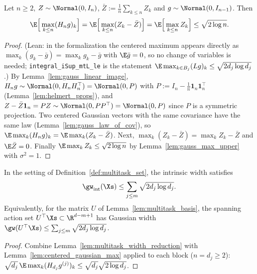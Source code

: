 \begin{lemma}\label{lem:centered_gaussian_max}
\leanok
{}
Let $n \ge 2$, $Z \sim \Normal(0, I_n)$, $\bar Z := \frac1n\sum_{k\le n}Z_k$ and
$g \sim \Normal(0, I_{n-1})$. Then
\[
  \E\Big[\max_{k\le n}(H_ng)_k\Big] = \E\Big[\max_{k\le n}(Z_k - \bar Z)\Big]
  = \E\Big[\max_{k\le n}Z_k\Big] \le \sqrt{2\log n}.
\]
\end{lemma}

\begin{proof}
\leanok
{}
(Lean: in the formalization the centered maximum appears directly as
$\max_k(g_k - \bar g) = \max_kg_k - \bar g$ with $\E\bar g = 0$, so no change of
variables is needed; \texttt{integral\_iSup\_mtL\_le} is the statement
$\E\max_{k\in B_j}(Lg)_k \le \sqrt{2d_j\log d_j}$.)
By Lemma~\ref{lem:gauss_linear_image}, $H_ng \sim \Normal(0, H_nH_n^\top) = \Normal(0, P)$
with $P := I_n - \frac1n\mathbf 1_n\mathbf 1_n^\top$ (Lemma~\ref{lem:helmert_props}), and
$Z - \bar Z\mathbf 1_n = PZ \sim \Normal(0, PP^\top) = \Normal(0,P)$ since $P$ is a symmetric
projection. Two centered Gaussian vectors with the same covariance have the same law
(Lemma~\ref{lem:gauss_law_of_cov}), so $\E\max_k(H_ng)_k = \E\max_k(Z_k - \bar Z)$. Next,
$\max_k(Z_k - \bar Z) = \max_kZ_k - \bar Z$ and $\E\bar Z = 0$. Finally
$\E\max_kZ_k \le \sqrt{2\log n}$ by Lemma~\ref{lem:gauss_max_upper} with $\sigma^2 = 1$.
\end{proof}

\begin{proposition}\label{prop:width_multitask}
\leanok
{}
In the setting of Definition~\ref{def:multitask_set}, the intrinsic width satisfies
\[
  \gw_{\mathrm{int}}(\Xs) \le \sum_{j\le m}\sqrt{2 d_j\log d_j}.
\]
Equivalently, for the matrix $U$ of Lemma~\ref{lem:multitask_basis}, the spanning action set
$U^\top\Xs \subset \R^{d-m+1}$ has Gaussian width $\gw(U^\top\Xs) \le \sum_{j\le m}\sqrt{2d_j\log d_j}$.
\end{proposition}

\begin{proof}
\leanok
{}
Combine Lemma~\ref{lem:multitask_width_reduction} with Lemma~\ref{lem:centered_gaussian_max}
applied to each block ($n = d_j \ge 2$):
$\sqrt{d_j}\,\E\max_k(H_{d_j}g^{(j)})_k \le \sqrt{d_j}\sqrt{2\log d_j}$.
\end{proof}

